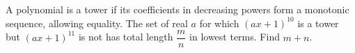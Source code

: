 A polynomial is a tower if its coefficients in decreasing powers form a monotonic sequence, allowing equality. The set of real $a$ for which $(ax+1)^{10}$ is a tower but $(ax+1)^{11}$ is not has total length $\dfrac{m}{n}$ in lowest terms. Find $m+n$.
